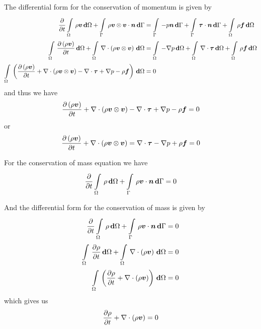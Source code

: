 The differential form for the conservation of momentum is given by
\begin{equation}
  \begin{split}
    \delby{}{t}\gint{\Omega}{}{\rho\vectr{v}}{\Omega}+
    \gint{\Gamma}{}{\dotprod{\tensorprod{\rho\vectr{v}}{\vectr{v}}}{\vectr{n}}}{\Gamma}
    &=\gint{\Gamma}{}{-p\vectr{n}}{\Gamma}+\gint{\Gamma}{}{\dotprod{\tensor{\tau}}{\vectr{n}}}{\Gamma}
    +\gint{\Omega}{}{\rho\vectr{f}}{\Omega} \\
    \gint{\Omega}{}{\delby{\pbrac{\rho\vectr{v}}}{t}}{\Omega}
    +\gint{\Omega}{}{\divergence{}{\pbrac{\tensorprod{\rho\vectr{v}}{\vectr{v}}}}}{\Omega}
    &=\gint{\Omega}{}{-\gradient{}{p}}{\Omega}+\gint{\Omega}{}{\divergence{}{\tensor{\tau}}}{\Omega}
    +\gint{\Omega}{}{\rho\vectr{f}}{\Omega}\\
    \gint{\Omega}{}{\pbrac{\delby{\pbrac{\rho\vectr{v}}}{t}
        +\divergence{}{\pbrac{\tensorprod{\rho\vectr{v}}{\vectr{v}}}}
        -\divergence{}{\tensor{\tau}}+\gradient{}{p}-\rho\vectr{f}}}{\Omega}&=0
  \end{split}
\end{equation}
and thus we have
\begin{equation}
  \delby{\pbrac{\rho\vectr{v}}}{t}+\divergence{}{\pbrac{\tensorprod{\rho\vectr{v}}{\vectr{v}}}}
  -\divergence{}{\tensor{\tau}}+\gradient{}{p}-\rho\vectr{f}=0
\end{equation}
or
\begin{equation}
  \delby{\pbrac{\rho\vectr{v}}}{t}+\divergence{}{\pbrac{\tensorprod{\rho\vectr{v}}{\vectr{v}}}}
  =\divergence{}{\tensor{\tau}}-\gradient{}{p}+\rho\vectr{f}=0
  \label{eqn:differentialconservationofmomentum}
\end{equation}

For the conservation of mass equation we have
\begin{equation}
  \delby{}{t}\gint{\Omega}{}{\rho}{\Omega}+\gint{\Gamma}{}{\dotprod{\rho\vectr{v}}{\vectr{n}}}{\Gamma}=0
  \label{eqn:integralconservationofmass}
\end{equation}

And the differential form for the conservation of mass is given by
\begin{equation}
  \begin{split}
    \delby{}{t}\gint{\Omega}{}{\rho}{\Omega}+\gint{\Gamma}{}{\dotprod{\rho\vectr{v}}{\vectr{n}}}{\Gamma}&=0
    \\
    \gint{\Omega}{}{\delby{\rho}{t}}{\Omega}+\gint{\Omega}{}{\divergence{}{\pbrac{\rho\vectr{v}}}}{\Omega}&=0\\
    \gint{\Omega}{}{\pbrac{\delby{\rho}{t}+\divergence{}{\pbrac{\rho\vectr{v}}}}}{\Omega}&=0
  \end{split}
\end{equation}
which gives us
\begin{equation}
  \delby{\rho}{t}+\divergence{}{\pbrac{\rho\vectr{v}}}=0
  \label{eqn:differentialconservationofmass}
\end{equation}

